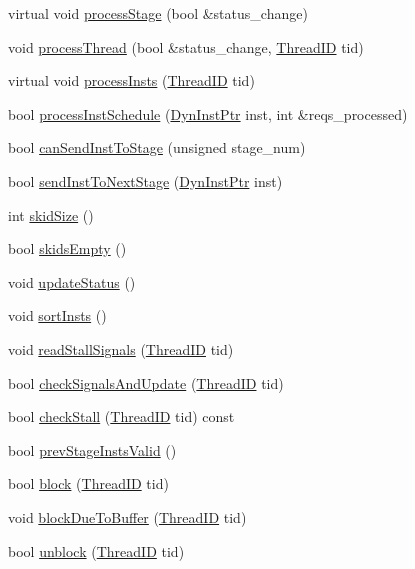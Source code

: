 \begin{DoxyCompactItemize}
\item 
virtual void \hyperlink{classPipelineStage_a0782fca2c80ef367ee914d464584ab20}{processStage} (bool \&status\_\-change)
\item 
void \hyperlink{classPipelineStage_a3e391d45d3f6411be62510f3b23105c9}{processThread} (bool \&status\_\-change, \hyperlink{base_2types_8hh_ab39b1a4f9dad884694c7a74ed69e6a6b}{ThreadID} tid)
\item 
virtual void \hyperlink{classPipelineStage_a4120d7c6b83eb82877f4d21109c105ba}{processInsts} (\hyperlink{base_2types_8hh_ab39b1a4f9dad884694c7a74ed69e6a6b}{ThreadID} tid)
\item 
bool \hyperlink{classPipelineStage_ac8bd857e45d0b201ea328b6ea8bcb890}{processInstSchedule} (\hyperlink{classRefCountingPtr}{DynInstPtr} inst, int \&reqs\_\-processed)
\item 
bool \hyperlink{classPipelineStage_a4666632f247a5d92380cb32d6e286c75}{canSendInstToStage} (unsigned stage\_\-num)
\item 
bool \hyperlink{classPipelineStage_a3a5710b990e95498611464d54c90dcf1}{sendInstToNextStage} (\hyperlink{classRefCountingPtr}{DynInstPtr} inst)
\item 
int \hyperlink{classPipelineStage_a112431820c072831aa16794d42dc25e4}{skidSize} ()
\item 
bool \hyperlink{classPipelineStage_afe3e2673d17dd5c568862ef5ae68b4d8}{skidsEmpty} ()
\item 
void \hyperlink{classPipelineStage_a4bb9486757ce225941aaaf759b357a57}{updateStatus} ()
\item 
void \hyperlink{classPipelineStage_a9ff2aa32ab0f40674cb3518108d62f8e}{sortInsts} ()
\item 
void \hyperlink{classPipelineStage_ad65c9f053a6038ac8c34c34bfe9a88c3}{readStallSignals} (\hyperlink{base_2types_8hh_ab39b1a4f9dad884694c7a74ed69e6a6b}{ThreadID} tid)
\item 
bool \hyperlink{classPipelineStage_af77f2bf38a75182c65e633b9fdf295d2}{checkSignalsAndUpdate} (\hyperlink{base_2types_8hh_ab39b1a4f9dad884694c7a74ed69e6a6b}{ThreadID} tid)
\item 
bool \hyperlink{classPipelineStage_a6ba4f2f95d991f5be818dabf7500feed}{checkStall} (\hyperlink{base_2types_8hh_ab39b1a4f9dad884694c7a74ed69e6a6b}{ThreadID} tid) const 
\item 
bool \hyperlink{classPipelineStage_ab03996f3423928a0e84dc3df7fd493f2}{prevStageInstsValid} ()
\item 
bool \hyperlink{classPipelineStage_ad1993925abd15d3fb59fde2ccfa3d678}{block} (\hyperlink{base_2types_8hh_ab39b1a4f9dad884694c7a74ed69e6a6b}{ThreadID} tid)
\item 
void \hyperlink{classPipelineStage_aee83987cebca092f91d7328291e7d40f}{blockDueToBuffer} (\hyperlink{base_2types_8hh_ab39b1a4f9dad884694c7a74ed69e6a6b}{ThreadID} tid)
\item 
bool \hyperlink{classPipelineStage_a9cc3b95f6969935f78c0158aa5145021}{unblock} (\hyperlink{base_2types_8hh_ab39b1a4f9dad884694c7a74ed69e6a6b}{ThreadID} tid)
\end{DoxyCompactItemize}
